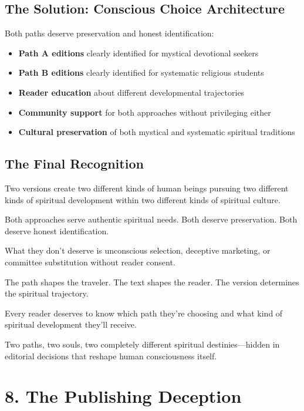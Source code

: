 \documentclass[11pt,twoside]{book}
\begin{document}
\section*{The Solution: Conscious Choice Architecture}
\label{sec:org2ee7f0b}

Both paths deserve preservation and honest identification:

\begin{itemize}
\item \textbf{\textbf{Path A editions}} clearly identified for mystical devotional seekers
\item \textbf{\textbf{Path B editions}} clearly identified for systematic religious students
\item \textbf{\textbf{Reader education}} about different developmental trajectories
\item \textbf{\textbf{Community support}} for both approaches without privileging either
\item \textbf{\textbf{Cultural preservation}} of both mystical and systematic spiritual traditions
\end{itemize}
\section*{The Final Recognition}
\label{sec:org307b6f7}

Two versions create two different kinds of human beings pursuing two different kinds of spiritual development within two different kinds of spiritual culture.

Both approaches serve authentic spiritual needs. Both deserve preservation. Both deserve honest identification.

What they don't deserve is unconscious selection, deceptive marketing, or committee substitution without reader consent.

The path shapes the traveler. The text shapes the reader. The version determines the spiritual trajectory.

Every reader deserves to know which path they're choosing and what kind of spiritual development they'll receive.

Two paths, two souls, two completely different spiritual destinies—hidden in editorial decisions that reshape human consciousness itself.
\chapter*{8. The Publishing Deception}
\label{sec:org87b4506}
\end{document}
